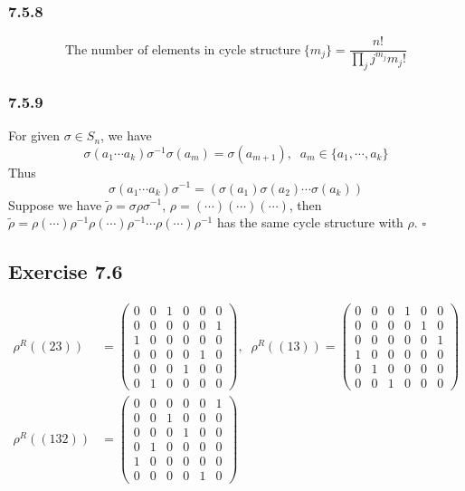 \documentclass[]{ctexart}
\begin{document}
\subsubsection*{7.5.8}
\begin{equation*}
\text{The number of elements in cycle structure}\;\{m_j\}=\frac{n!}{\prod_jj^{m_j}m_j!}
\end{equation*}
\subsubsection*{7.5.9}
For given $\sigma\in S_n$, we have 
\begin{equation*}
\sigma(a_1\cdots a_k)\sigma^{-1}\sigma(a_m)=\sigma(a_{m+1}),\;\;a_m\in\{a_1,\cdots,a_k\}
\end{equation*}
Thus 
\begin{equation*}
\sigma(a_1\cdots a_k)\sigma^{-1}=(\sigma(a_1)\sigma(a_2)\cdots\sigma(a_k))
\end{equation*}
Suppose we have $\tilde{\rho}=\sigma\rho\sigma^{-1}$, $\rho=(\cdots)(\cdots)(\cdots)$, then $\tilde{\rho}=\rho(\cdots)\rho^{-1}\rho(\cdots)\rho^{-1}\cdots\rho(\cdots)\rho^{-1}$ 
has the same cycle structure with $\rho$. $\square$ 
\subsection{Exercise 7.6}
\begin{align*}
\rho^R((23))&=\begin{pmatrix}
0 & 0 & 1 & 0 & 0 & 0\\
0 & 0 & 0 & 0 & 0 & 1\\
1 & 0 & 0 & 0 & 0 & 0\\
0 & 0 & 0 & 0 & 1 & 0\\
0 & 0 & 0 & 1 & 0 & 0\\
0 & 1 & 0 & 0 & 0 & 0
\end{pmatrix},\;\;\rho^R((13))=\begin{pmatrix}
0 & 0 & 0 & 1 & 0 & 0\\
0 & 0 & 0 & 0 & 1 & 0\\
0 & 0 & 0 & 0 & 0 & 1\\
1 & 0 & 0 & 0 & 0 & 0\\
0 & 1 & 0 & 0 & 0 & 0\\
0 & 0 & 1 & 0 & 0 & 0
\end{pmatrix}\\
\rho^R((132))&=\begin{pmatrix}
0 & 0 & 0 & 0 & 0 & 1\\
0 & 0 & 1 & 0 & 0 & 0\\
0 & 0 & 0 & 1 & 0 & 0\\
0 & 1 & 0 & 0 & 0 & 0\\
1 & 0 & 0 & 0 & 0 & 0\\
0 & 0 & 0 & 0 & 1 & 0
\end{pmatrix}
\end{align*}
\end{document}
